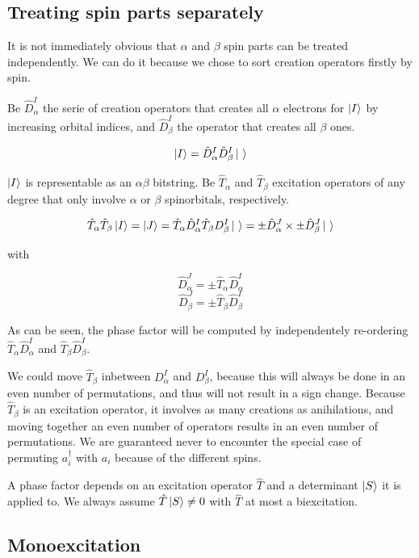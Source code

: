 \documentclass[./thesis.tex]{subfiles}
\begin{document}
\subsection{Treating spin parts separately}

It is not immediately obvious that $\alpha$ and $\beta$ spin parts can be treated independently. We can do it because we chose to sort creation operators firstly by spin.

Be $\hat D_\alpha^I$ the serie of creation operators that creates all $\alpha$ electrons for $\ket I$ by increasing orbital indices, and $\hat D_\beta^I$ the operator that creates all $\beta$ ones.

$$\ket I = \hat D_\alpha^I \hat D_\beta^I \ket \ $$


$\ket I$ is representable as an $\alpha \beta$ bitstring. Be $\hat T_\alpha$ and $\hat T_\beta$ excitation operators of any degree that only involve $\alpha$ or $\beta$ spinorbitals, respectively.

$$\hat T_\alpha \hat T_\beta \ket I = \ket J = \hat T_\alpha \hat D_\alpha^I \hat T_\beta D_\beta^I \ket \ = \pm \hat D_\alpha^J \times \pm \hat D_\beta^J \ket \ $$

with

$$\hat D_\alpha^J = \pm \hat T_\alpha \hat D_\alpha^I$$
$$\hat D_\beta^J = \pm \hat T_\beta \hat D_\beta^I$$

As can be seen, the phase factor will be computed by independentely re-ordering $\hat T_\alpha \hat D_\alpha^I$ and $\hat T_\beta \hat D_\beta^I$.

We could move $\hat T_\beta$ inbetween $D_\alpha^I$ and $D_\beta^I$, because this will always be done in an even number of permutations, and thus will not result in a sign change. Because $\hat T_\beta$ is an excitation operator, it involves as many creations as anihilations, and moving together an even number of operators results in an even number of permutations. We are guaranteed never to encounter the special case of permuting $a^\dagger_i$ with $a_i$ because of the different spins.






A phase factor depends on an excitation operator $\hat T$ and a determinant $\ket S$ it is applied to. We always assume $\hat T \ket S \neq 0$ with $\hat T$ at most a biexcitation. 



\subsection{Monoexcitation}
\end{document}
